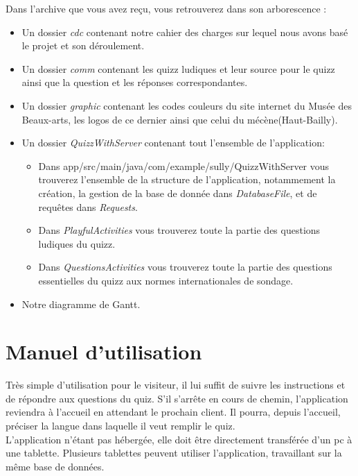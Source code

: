 \documentclass[12]{report}
\begin{document}
    Dans l'archive que vous avez reçu, vous retrouverez dans son arborescence :
    \begin{itemize}
        \item Un dossier \emph{cdc} contenant notre cahier des charges sur lequel nous avons basé le projet et son déroulement.
        \item Un dossier \emph{comm} contenant les quizz ludiques et leur source pour le quizz ainsi que la question et les réponses correspondantes.
        \item Un dossier \emph{graphic} contenant les codes couleurs du site internet du Musée des Beaux-arts, les logos de ce dernier ainsi que celui du mécène(Haut-Bailly).
        \item Un dossier \emph{QuizzWithServer} contenant tout l'ensemble de l'application: \begin{itemize}
            \item Dans app/src/main/java/com/example/sully/QuizzWithServer vous trouverez l'ensemble de la structure de l'application, notammement la création, la gestion de la base de donnée dans \emph{DatabaseFile}, et de requêtes dans \emph{Requests}.
            \item Dans \emph{PlayfulActivities} vous trouverez toute la partie des questions ludiques du quizz.
            \item Dans \emph{QuestionsActivities} vous trouverez toute la partie des questions essentielles du quizz aux normes internationales de sondage.
        \end{itemize}
        \item Notre diagramme de Gantt.

    \end{itemize}
    \section{Manuel d'utilisation}

  Très simple d'utilisation pour le visiteur, il lui suffit de suivre les instructions et de répondre aux questions du quiz.
  S'il s'arrête en cours de chemin, l'application reviendra à l'accueil en attendant le prochain client.
  Il pourra, depuis l'accueil, préciser la langue dans laquelle il veut remplir le quiz. \\

  L'application n'étant pas hébergée, elle doit être directement transférée d'un pc à une tablette.
  Plusieurs tablettes peuvent utiliser l'application, travaillant sur la même base de données. \\
\end{document}
